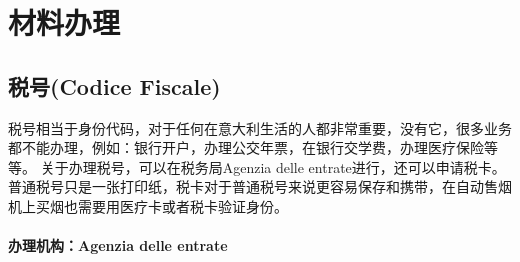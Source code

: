 
% 


\chapter{材料办理}                 


\section{税号(Codice Fiscale)}
税号相当于身份代码，对于任何在意大利生活的人都非常重要，没有它，很多业务都不能办理，例如：银行开户，办理公交年票，在银行交学费，办理医疗保险等等。
关于办理税号，可以在税务局Agenzia delle entrate进行，还可以申请税卡。普通税号只是一张打印纸，税卡对于普通税号来说更容易保存和携带，在自动售烟机上买烟也需要用医疗卡或者税卡验证身份。


\subsubsection{办理机构：Agenzia delle entrate}

